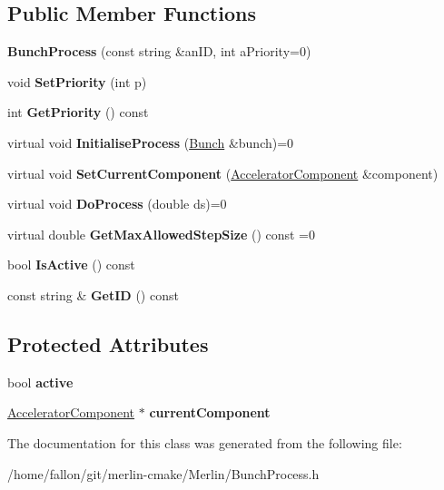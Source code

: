 \subsection*{Public Member Functions}
\begin{DoxyCompactItemize}
\item 
\mbox{\label{classBunchProcess_a5ec5af6ed253cd2f92dab04a6ee7a301}} 
{\bfseries Bunch\+Process} (const string \&an\+ID, int a\+Priority=0)
\item 
\mbox{\label{classBunchProcess_aa3110b3448fb4c5ce859f6dd0cc5a1eb}} 
void {\bfseries Set\+Priority} (int p)
\item 
\mbox{\label{classBunchProcess_a29d3480447a2035719f43b1c95d51a20}} 
int {\bfseries Get\+Priority} () const
\item 
\mbox{\label{classBunchProcess_a8c8732d2cc71b545387a27cc8adc74ff}} 
virtual void {\bfseries Initialise\+Process} (\hyperlink{classBunch}{Bunch} \&bunch)=0
\item 
\mbox{\label{classBunchProcess_a319a4b99d3b042832af4f18a733403fd}} 
virtual void {\bfseries Set\+Current\+Component} (\hyperlink{classAcceleratorComponent}{Accelerator\+Component} \&component)
\item 
\mbox{\label{classBunchProcess_a8add569705fe42dac0dbc1504d774901}} 
virtual void {\bfseries Do\+Process} (double ds)=0
\item 
\mbox{\label{classBunchProcess_a6bfda24adc7b189da4affba9b01b8240}} 
virtual double {\bfseries Get\+Max\+Allowed\+Step\+Size} () const =0
\item 
\mbox{\label{classBunchProcess_af6dcbeb4426b78109b73db2d3adcb8e5}} 
bool {\bfseries Is\+Active} () const
\item 
\mbox{\label{classBunchProcess_a416caaff14b5ca631fe262baf83ccf1a}} 
const string \& {\bfseries Get\+ID} () const
\end{DoxyCompactItemize}
\subsection*{Protected Attributes}
\begin{DoxyCompactItemize}
\item 
\mbox{\label{classBunchProcess_a1195731a895d235e3bb209a9d68403e2}} 
bool {\bfseries active}
\item 
\mbox{\label{classBunchProcess_a296359b6cf1acd671709188cee5a39f4}} 
\hyperlink{classAcceleratorComponent}{Accelerator\+Component} $\ast$ {\bfseries current\+Component}
\end{DoxyCompactItemize}


The documentation for this class was generated from the following file\+:\begin{DoxyCompactItemize}
\item 
/home/fallon/git/merlin-\/cmake/\+Merlin/Bunch\+Process.\+h\end{DoxyCompactItemize}
